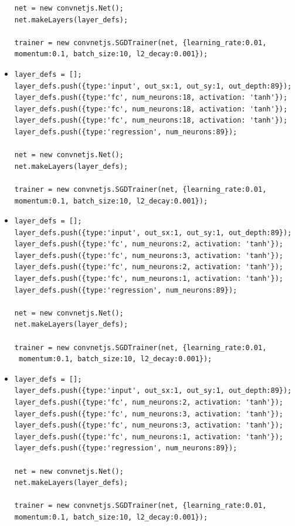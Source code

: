 \begin{itemize}
\begin{verbatim}
net = new convnetjs.Net();
net.makeLayers(layer_defs);

trainer = new convnetjs.SGDTrainer(net, {learning_rate:0.01, 
momentum:0.1, batch_size:10, l2_decay:0.001});
\end{verbatim}

\item \begin{verbatim}
layer_defs = [];
layer_defs.push({type:'input', out_sx:1, out_sy:1, out_depth:89});
layer_defs.push({type:'fc', num_neurons:18, activation: 'tanh'});
layer_defs.push({type:'fc', num_neurons:18, activation: 'tanh'});
layer_defs.push({type:'fc', num_neurons:18, activation: 'tanh'});
layer_defs.push({type:'regression', num_neurons:89});

net = new convnetjs.Net();
net.makeLayers(layer_defs);

trainer = new convnetjs.SGDTrainer(net, {learning_rate:0.01, 
momentum:0.1, batch_size:10, l2_decay:0.001});
\end{verbatim}

\item \begin{verbatim}
layer_defs = [];
layer_defs.push({type:'input', out_sx:1, out_sy:1, out_depth:89});
layer_defs.push({type:'fc', num_neurons:2, activation: 'tanh'});
layer_defs.push({type:'fc', num_neurons:3, activation: 'tanh'});
layer_defs.push({type:'fc', num_neurons:2, activation: 'tanh'});
layer_defs.push({type:'fc', num_neurons:1, activation: 'tanh'});
layer_defs.push({type:'regression', num_neurons:89});

net = new convnetjs.Net();
net.makeLayers(layer_defs);

trainer = new convnetjs.SGDTrainer(net, {learning_rate:0.01,
 momentum:0.1, batch_size:10, l2_decay:0.001});
\end{verbatim}

\item \begin{verbatim}
layer_defs = [];
layer_defs.push({type:'input', out_sx:1, out_sy:1, out_depth:89});
layer_defs.push({type:'fc', num_neurons:2, activation: 'tanh'});
layer_defs.push({type:'fc', num_neurons:3, activation: 'tanh'});
layer_defs.push({type:'fc', num_neurons:3, activation: 'tanh'});
layer_defs.push({type:'fc', num_neurons:1, activation: 'tanh'});
layer_defs.push({type:'regression', num_neurons:89});

net = new convnetjs.Net();
net.makeLayers(layer_defs);

trainer = new convnetjs.SGDTrainer(net, {learning_rate:0.01, 
momentum:0.1, batch_size:10, l2_decay:0.001});
\end{verbatim}


\end{itemize}
